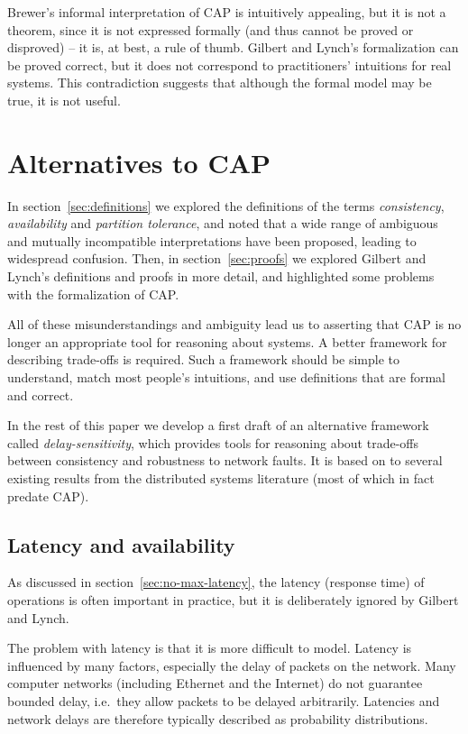 \documentclass[fleqn,12pt,lineno]{wlpeerj} %
\begin{document}
Brewer's informal interpretation of CAP is intuitively appealing, but it is not a theorem, since it
is not expressed formally (and thus cannot be proved or disproved) -- it is, at best, a rule of
thumb. Gilbert and Lynch's formalization can be proved correct, but it does not correspond to
practitioners' intuitions for real systems. This contradiction suggests that although the formal
model may be true, it is not useful.

\section{Alternatives to CAP}\label{sec:alternatives}

In section~\ref{sec:definitions} we explored the definitions of the terms \emph{consistency},
\emph{availability} and \emph{partition tolerance}, and noted that a wide range of ambiguous and
mutually incompatible interpretations have been proposed, leading to widespread confusion. Then,
in section~\ref{sec:proofs} we explored Gilbert and Lynch's definitions and proofs in more detail,
and highlighted some problems with the formalization of CAP.

All of these misunderstandings and ambiguity lead us to asserting that CAP is no longer an
appropriate tool for reasoning about systems. A better framework for describing trade-offs is
required. Such a framework should be simple to understand, match most people's intuitions, and use
definitions that are formal and correct.

In the rest of this paper we develop a first draft of an alternative framework called
\emph{delay-sensitivity}, which provides tools for reasoning about trade-offs between consistency
and robustness to network faults. It is based on to several existing results from the distributed
systems literature (most of which in fact predate CAP).

\subsection{Latency and availability}\label{sec:latency-availability}

As discussed in section~\ref{sec:no-max-latency}, the latency (response time) of operations is often
important in practice, but it is deliberately ignored by Gilbert and Lynch.

The problem with latency is that it is more difficult to model. Latency is influenced by many
factors, especially the delay of packets on the network. Many computer networks (including Ethernet
and the Internet) do not guarantee bounded delay, i.e.\ they allow packets to be delayed
arbitrarily. Latencies and network delays are therefore typically described as probability
distributions.
\end{document}
